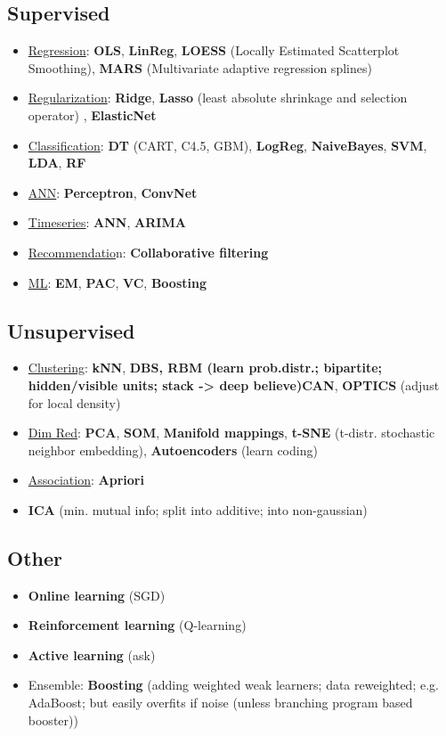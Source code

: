 \documentclass{article}
\begin{document}
\begin{multicols}{3}
\subsection{Supervised}
\begin{itemize}
\item \underline{Regression}: \textbf{OLS}, \textbf{LinReg}, \textbf{LOESS} (Locally Estimated Scatterplot Smoothing), \textbf{MARS} (Multivariate adaptive regression splines)
\item \underline{Regularization}: \textbf{Ridge}, \textbf{Lasso} (least absolute shrinkage and selection operator) , \textbf{ElasticNet}
\item \underline{Classification}: \textbf{DT} (CART, C4.5, GBM), \textbf{LogReg}, \textbf{NaiveBayes}, \textbf{SVM}, \textbf{LDA}, \textbf{RF}
\item \underline{ANN}: \textbf{Perceptron}, \textbf{ConvNet}
\item \underline{Timeseries}: \textbf{ANN}, \textbf{ARIMA}
\item \underline{Recommendatio}n: \textbf{Collaborative filtering}
\item \underline{ML}: \textbf{EM}, \textbf{PAC}, \textbf{VC}, \textbf{Boosting}
\end{itemize}

\subsection{Unsupervised}
\begin{itemize}
\item \underline{Clustering}: \textbf{kNN}, \textbf{DBS, \textbf{RBM} (learn prob.distr.; bipartite; hidden/visible units; stack -> deep believe)CAN}, \textbf{OPTICS} (adjust for local density)
\item \underline{Dim Red}: \textbf{PCA}, \textbf{SOM}, \textbf{Manifold mappings}, \textbf{t-SNE} (t-distr. stochastic neighbor embedding), \textbf{Autoencoders} (learn coding)
\item \underline{Association}: \textbf{Apriori}
\item \textbf{ICA} (min. mutual info; split into additive; into non-gaussian)
\end{itemize}

\subsection{Other}
\begin{itemize}
\item \textbf{Online learning} (SGD)
\item \textbf{Reinforcement learning} (Q-learning)
\item \textbf{Active learning} (ask)
\item Ensemble: \textbf{Boosting} (adding weighted weak learners; data reweighted; e.g. AdaBoost; but easily overfits if noise (unless branching program based booster))
\end{itemize}


\end{multicols}
\end{document}
